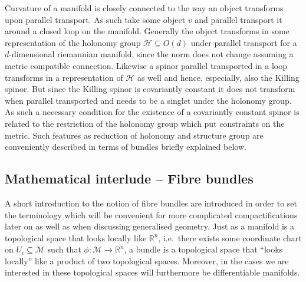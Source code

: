 Curvature of a manifold is closely connected to the way an object transforms upon parallel transport. As such take some object $v$ and parallel transport it around a closed loop on the manifold. Generally the object transforms in some representation of the holonomy group $\mathscr{H}\subseteq O(d)$ under parallel transport for a $d$-dimensional riemannian manifold, since the norm does not change assuming a metric compatible connection. Likewise a spinor parallel transported in a loop transforms in a representation of $\mathscr{H}$ as well and hence, especially, also the Killing spinor. But since the Killing spinor is covariantly constant it does not transform when parallel transported and needs to be a singlet under the holonomy group. As such a necessary condition for the existence of a covariantly constant spinor is related to the restriction of the holonomy group which put constraints on the metric. Such features as reduction of holonomy and structure group are conveniently described in terms of bundles briefly explained below.

\subsection{Mathematical interlude -- Fibre bundles}
A short introduction to the notion of fibre bundles are introduced in order to set the terminology which will be convenient for more complicated compactifications later on as well as when discussing generalised geometry. Just as a manifold is a topological space that looks locally like $\mathbb{R}^n$, i.e.\ there exists some coordinate chart on $U_i\subseteq \mathcal{M}$ such that $\phi: \mathcal{M}\to \mathbb{R}^n$, a bundle is a topological space that ``looks locally'' like a product of two topological spaces. Moreover, in the cases we are interested in these topological spaces will furthermore be differentiable manifolds. 

